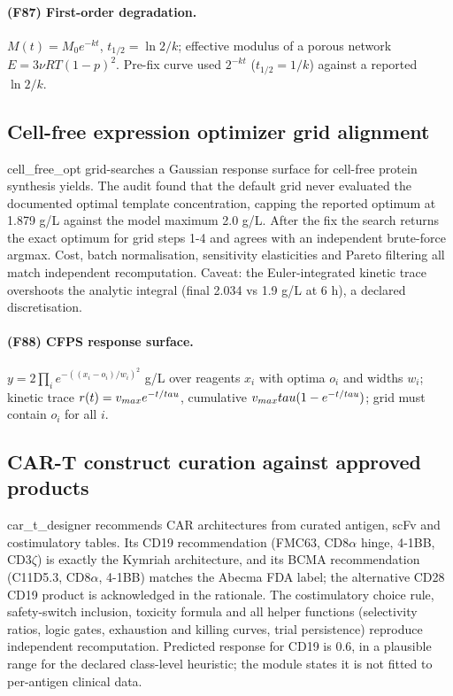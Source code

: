 \paragraph{(F87) First-order degradation.} $M(t)=M_0e^{-kt}$, $t_{1/2}=\ln 2/k$; effective modulus of a porous network $E=3\nu RT(1-p)^2$. Pre-fix curve used $2^{-kt}$ ($t_{1/2}=1/k$) against a reported $\ln 2/k$.
\subsection{Cell-free expression optimizer grid alignment}
cell\_free\_opt grid-searches a Gaussian response surface for cell-free protein synthesis yields. The audit found that the default grid never evaluated the documented optimal template concentration, capping the reported optimum at 1.879 g/L against the model maximum 2.0 g/L. After the fix the search returns the exact optimum for grid steps 1-4 and agrees with an independent brute-force argmax. Cost, batch normalisation, sensitivity elasticities and Pareto filtering all match independent recomputation. Caveat: the Euler-integrated kinetic trace overshoots the analytic integral (final 2.034 vs 1.9 g/L at 6 h), a declared discretisation.
\paragraph{(F88) CFPS response surface.} $y=2\prod_i e^{-((x_i-o_i)/w_i)^2}$ g/L over reagents $x_i$ with optima $o_i$ and widths $w_i$; kinetic trace $r(t)=v_{max}e^{-t/\\tau}$, cumulative $v_{max}\\tau(1-e^{-t/\\tau})$; grid must contain $o_i$ for all $i$.
\subsection{CAR-T construct curation against approved products}
car\_t\_designer recommends CAR architectures from curated antigen, scFv and costimulatory tables. Its CD19 recommendation (FMC63, CD8$\alpha$ hinge, 4-1BB, CD3$\zeta$) is exactly the Kymriah architecture, and its BCMA recommendation (C11D5.3, CD8$\alpha$, 4-1BB) matches the Abecma FDA label; the alternative CD28 CD19 product is acknowledged in the rationale. The costimulatory choice rule, safety-switch inclusion, toxicity formula and all helper functions (selectivity ratios, logic gates, exhaustion and killing curves, trial persistence) reproduce independent recomputation. Predicted response for CD19 is 0.6, in a plausible range for the declared class-level heuristic; the module states it is not fitted to per-antigen clinical data.
